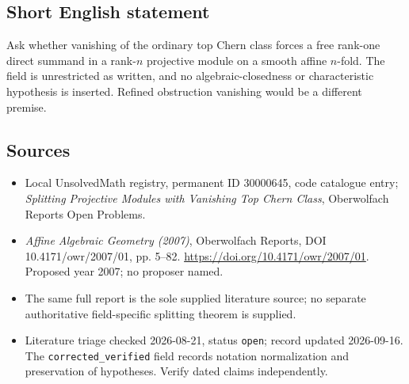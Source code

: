 \documentclass[11pt]{article}
\begin{document}
\subsection{Short English statement}
Ask whether vanishing of the ordinary top Chern class forces a free rank-one direct summand in a rank-\(n\) projective module on a smooth affine \(n\)-fold. The field is unrestricted as written, and no algebraic-closedness or characteristic hypothesis is inserted. Refined obstruction vanishing would be a different premise.
\subsection{Sources}
\begin{itemize}\item Local UnsolvedMath registry, permanent ID 30000645, code catalogue entry; \emph{Splitting Projective Modules with Vanishing Top Chern Class}, Oberwolfach Reports Open Problems.\item \emph{Affine Algebraic Geometry (2007)}, Oberwolfach Reports, DOI 10.4171/owr/2007/01, pp. 5--82. \url{https://doi.org/10.4171/owr/2007/01}. Proposed year 2007; no proposer named.\item The same full report is the sole supplied literature source; no separate authoritative field-specific splitting theorem is supplied.\item Literature triage checked 2026-08-21, status \texttt{open}; record updated 2026-09-16. The \texttt{corrected\_verified} field records notation normalization and preservation of hypotheses. Verify dated claims independently.\end{itemize}
\end{document}

